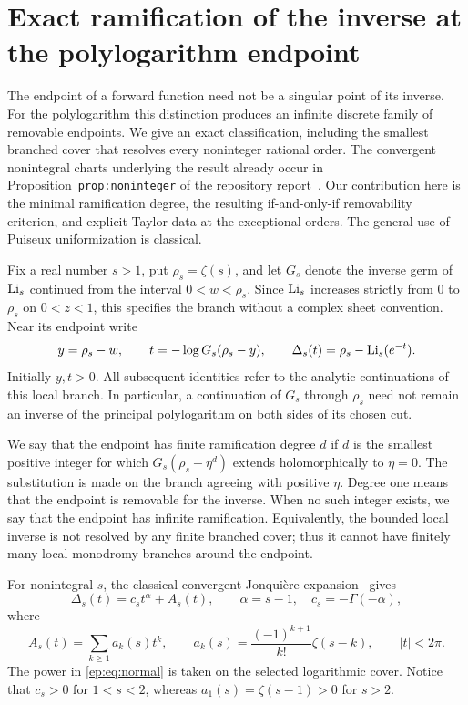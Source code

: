 \section{Exact ramification of the inverse at the polylogarithm endpoint}
\label{ep:sec}

The endpoint of a forward function need not be a singular point of its
inverse. For the polylogarithm this distinction produces an infinite
discrete family of removable endpoints. We give an exact classification,
including the smallest branched cover that resolves every noninteger rational order.
The convergent nonintegral charts underlying the result already occur in
Proposition~\texttt{prop:noninteger} of the repository report~\cite{RepoInverse}.
Our contribution here is the minimal ramification degree, the resulting
if-and-only-if removability criterion, and explicit Taylor data at the
exceptional orders. The general use of Puiseux uniformization is classical.

Fix a real number $s>1$, put $\rho_s=\zeta(s)$, and let $G_s$ denote
the inverse germ of $\operatorname{Li}_s$ continued from the interval
$0<w<\rho_s$. Since $\operatorname{Li}_s$ increases strictly from $0$
to $\rho_s$ on $0<z<1$, this specifies the branch without a complex
sheet convention. Near its endpoint write
\[
 y=\rho_s-w,\qquad t=-\log G_s(\rho_s-y),\qquad
 \Delta_s(t)=\rho_s-\operatorname{Li}_s(e^{-t}).
\]
Initially $y,t>0$. All subsequent identities refer to the analytic
continuations of this local branch. In particular, a continuation of
$G_s$ through $\rho_s$ need not remain an inverse of the principal
polylogarithm on both sides of its chosen cut.

We say that the endpoint has finite ramification degree $d$ if $d$ is
the smallest positive integer for which
$G_s(\rho_s-\eta^d)$ extends holomorphically to $\eta=0$.
The substitution is made on the branch agreeing with positive $\eta$.
Degree one means that the endpoint is removable for the inverse.
When no such integer exists, we say that the endpoint has infinite
ramification. Equivalently, the bounded local inverse is not resolved by
any finite branched cover; thus it cannot have finitely many local
monodromy branches around the endpoint.

For nonintegral $s$, the classical convergent Jonqui\`ere expansion~\cite{DLMF} gives
\begin{equation}
 \Delta_s(t)=c_s t^{\alpha}+A_s(t),\qquad
 \alpha=s-1,\quad c_s=-\Gamma(-\alpha),
 \label{ep:eq:normal}
\end{equation}
where
\begin{equation}
 A_s(t)=\sum_{k\ge1}a_k(s)t^k,
 \qquad a_k(s)=\frac{(-1)^{k+1}}{k!}\zeta(s-k),
 \qquad |t|<2\pi.
 \label{ep:eq:analytic}
\end{equation}
The power in \eqref{ep:eq:normal} is taken on the selected logarithmic
cover. Notice that $c_s>0$ for $1<s<2$, whereas
$a_1(s)=\zeta(s-1)>0$ for $s>2$.

